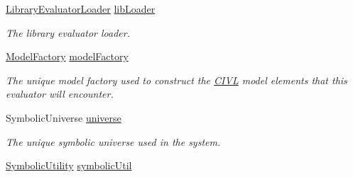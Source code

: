 \begin{DoxyCompactItemize}
\item 
\hyperlink{interfaceedu_1_1udel_1_1cis_1_1vsl_1_1civl_1_1semantics_1_1IF_1_1LibraryEvaluatorLoader}{Library\+Evaluator\+Loader} \hyperlink{classedu_1_1udel_1_1cis_1_1vsl_1_1civl_1_1semantics_1_1common_1_1CommonEvaluator_ac376c7581df851484bbcea00defabce3}{lib\+Loader}
\begin{DoxyCompactList}\small\item\em The library evaluator loader. \end{DoxyCompactList}\item 
\hypertarget{classedu_1_1udel_1_1cis_1_1vsl_1_1civl_1_1semantics_1_1common_1_1CommonEvaluator_aa8c2843544334f9c4364df7538f5809c}{}\hyperlink{interfaceedu_1_1udel_1_1cis_1_1vsl_1_1civl_1_1model_1_1IF_1_1ModelFactory}{Model\+Factory} \hyperlink{classedu_1_1udel_1_1cis_1_1vsl_1_1civl_1_1semantics_1_1common_1_1CommonEvaluator_aa8c2843544334f9c4364df7538f5809c}{model\+Factory}\label{classedu_1_1udel_1_1cis_1_1vsl_1_1civl_1_1semantics_1_1common_1_1CommonEvaluator_aa8c2843544334f9c4364df7538f5809c}

\begin{DoxyCompactList}\small\item\em The unique model factory used to construct the \hyperlink{classedu_1_1udel_1_1cis_1_1vsl_1_1civl_1_1CIVL}{C\+I\+V\+L} model elements that this evaluator will encounter. \end{DoxyCompactList}\item 
\hypertarget{classedu_1_1udel_1_1cis_1_1vsl_1_1civl_1_1semantics_1_1common_1_1CommonEvaluator_a490198aa0119fd887bb9b82fc2c6b0af}{}Symbolic\+Universe \hyperlink{classedu_1_1udel_1_1cis_1_1vsl_1_1civl_1_1semantics_1_1common_1_1CommonEvaluator_a490198aa0119fd887bb9b82fc2c6b0af}{universe}\label{classedu_1_1udel_1_1cis_1_1vsl_1_1civl_1_1semantics_1_1common_1_1CommonEvaluator_a490198aa0119fd887bb9b82fc2c6b0af}

\begin{DoxyCompactList}\small\item\em The unique symbolic universe used in the system. \end{DoxyCompactList}\item 
\hypertarget{classedu_1_1udel_1_1cis_1_1vsl_1_1civl_1_1semantics_1_1common_1_1CommonEvaluator_a38a592becbd84110bed227073b7ac748}{}\hyperlink{interfaceedu_1_1udel_1_1cis_1_1vsl_1_1civl_1_1dynamic_1_1IF_1_1SymbolicUtility}{Symbolic\+Utility} \hyperlink{classedu_1_1udel_1_1cis_1_1vsl_1_1civl_1_1semantics_1_1common_1_1CommonEvaluator_a38a592becbd84110bed227073b7ac748}{symbolic\+Util}\label{classedu_1_1udel_1_1cis_1_1vsl_1_1civl_1_1semantics_1_1common_1_1CommonEvaluator_a38a592becbd84110bed227073b7ac748}


\end{DoxyCompactItemize}
